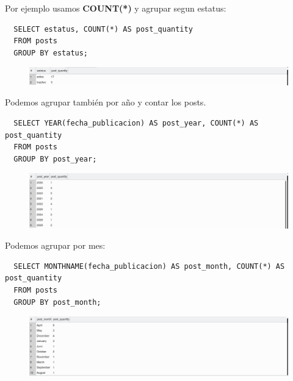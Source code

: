\documentclass{article}
\begin{document}
Por ejemplo usamos \textbf{COUNT(*)} y agrupar segun estatus:\\

\begin{verbatim}
  SELECT estatus, COUNT(*) AS post_quantity
  FROM posts
  GROUP BY estatus;
\end{verbatim}

\begin{figure}[h!]
  \centering
  \includegraphics[scale=0.5]{./Pictures/118_group_by.png}
\end{figure}

Podemos agrupar también por año y contar los posts.\\

\begin{verbatim}
  SELECT YEAR(fecha_publicacion) AS post_year, COUNT(*) AS post_quantity
  FROM posts
  GROUP BY post_year;
\end{verbatim}

\newpage

\begin{figure}[h!]
  \centering
  \includegraphics[scale=0.5]{./Pictures/119_group_by_year.png}
\end{figure}

Podemos agrupar por mes:\\

\begin{verbatim}
  SELECT MONTHNAME(fecha_publicacion) AS post_month, COUNT(*) AS post_quantity
  FROM posts
  GROUP BY post_month;
\end{verbatim}

\begin{figure}[h!]
  \centering
  \includegraphics[scale=0.5]{./Pictures/120_group_by_monthname.png}
\end{figure}
\end{document}
